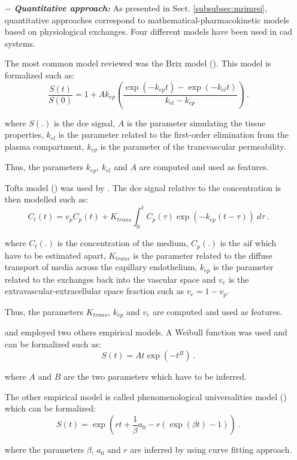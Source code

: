 \begin{enumerate}[leftmargin=*]
\item[$-$] \textbf{\textit{Quantitative approach:}} As presented in Sect. \ref{subsubsec:mrimrsi}, quantitative approaches correspond to mathematical-pharmacokinetic models based on physiological exchanges. Four different models have been used in \ac{cad} systems. 

The most common model reviewed was the Brix model (\cite{Artan2009,Artan2010,Sung2011,Liu2009,Ozer2009,Ozer2010}). This model is formalized such as:
\begin{equation}
	\frac{S(t)}{S(0)} = 1 + A k_{ep} \left( \frac{\exp( -k_{ep} t ) - \exp( -k_{el} t )}{k_{el} - k_{ep}} \right) \ .
	\label{eq:brixmod}
\end{equation}

\noindent where $S(.)$ is the \ac{dce} signal, $A$ is the parameter simulating the tissue properties, $k_{el}$ is the parameter related to the first-order elimination from the plasma compartment, $k_{ep}$ is the parameter of the transvascular permeability.

Thus, the parameters $k_{ep}$, $k_{el}$ and $A$ are computed and used as features.

Tofts model (\cite{Tofts1997}) was used by \cite{Langer2009,Giannini2013,Niaf2011,Niaf2012,Mazzetti2011}. The \ac{dce} signal relative to the concentration is then modelled such as:
\begin{equation}
	C_t(t) = v_p C_p(t) + K_{trans} \int_{0}^{t} C_p(\tau) \exp( -k_{ep}(t-\tau) ) \ d\tau \ .
	\label{eq:tofts} 
\end{equation}

\noindent where $C_t(.)$ is the concentration of the medium, $C_p(.)$ is the \ac{aif} which have to be estimated apart, $K_{trans}$ is the parameter related to the diffuse transport of media across the capillary endothelium, $k_{ep}$ is the parameter related to the exchanges back into the vascular space and $v_e$ is the extravascular-extracellular space fraction such as $v_e = 1 - v_p$. 

Thus, the parameters $K_{trans}$, $k_{ep}$ and $v_e$ are computed and used as features.

\cite{Mazzetti2011} and \cite{Giannini2013} employed two others empirical models. A Weibull function was used and can be formalized such as:
\begin{equation}
	S(t) = A t \exp( -t^{B} ) \ .
	\label{eq:weibull}
\end{equation}

\noindent where $A$ and $B$ are the two parameters which have to be inferred.

The other empirical model is called phenomenological universalities model (\cite{Castorina2006}) which can be formalized:
\begin{equation}
	S(t) = \exp \left( r t + \frac{1}{\beta} a_0 - r ( \exp( \beta t ) - 1 ) \right) \ .
	\label{eq:pun}
\end{equation}

\noindent where the parameters $\beta$, $a_0$ and $r$ are inferred by using curve fitting approach.

\end{enumerate}

